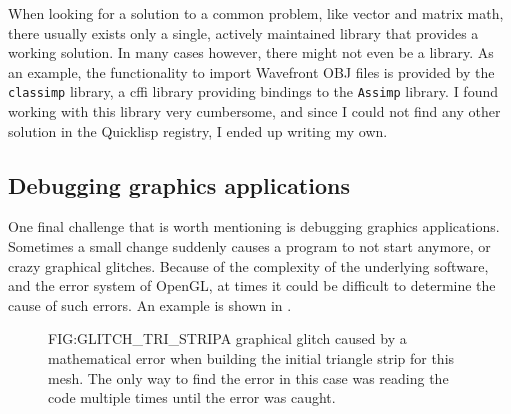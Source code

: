 When looking for a solution to a common problem,
like vector and matrix math,
there usually exists only a single,
actively maintained library that provides a working solution.
In many cases however,
there might not even be a library.
As an example,
the functionality to import Wavefront OBJ files is provided by the \texttt{classimp} library,
a \ac{cffi} library providing bindings to the \texttt{Assimp} library.
I found working with this library very cumbersome,
and since I could not find any other solution in the Quicklisp registry,
I ended up writing my own.

\subsection{Debugging graphics applications}

One final challenge that is worth mentioning is debugging graphics applications.
Sometimes a small change suddenly causes a program to not start anymore,
or crazy graphical glitches.
Because of the complexity of the underlying software,
and the error system of OpenGL,
at times it could be difficult to determine the cause of such errors.
An example is shown in .

\begin{figure}[Graphical glitch \textemdash\, Triangle strip]{FIG:GLITCH_TRI_STRIP}{A graphical glitch caused by a mathematical error when building the initial triangle strip for this mesh. The only way to find the error in this case was reading the code multiple times until the error was caught.}
\end{figure}

  
